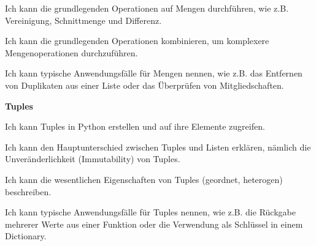 \begin{todolist}
\begin{todolist}
        \item Ich kann die grundlegenden Operationen auf Mengen durchführen, wie z.B. Vereinigung, Schnittmenge und Differenz.
        \item Ich kann die grundlegenden Operationen kombinieren, um komplexere Mengenoperationen durchzuführen.
        \item Ich kann typische Anwendungsfälle für Mengen nennen, wie z.B. das Entfernen von Duplikaten aus einer Liste oder das Überprüfen von Mitgliedschaften.
    \end{todolist}
    \item \textbf{Tuples}
    \begin{todolist}
        \item Ich kann Tuples in Python erstellen und auf ihre Elemente zugreifen.
        \item Ich kann den Hauptunterschied zwischen Tuples und Listen erklären, nämlich die Unveränderlichkeit (Immutability) von Tuples.
        \item Ich kann die wesentlichen Eigenschaften von Tuples (geordnet, heterogen) beschreiben.
        \item Ich kann typische Anwendungsfälle für Tuples nennen, wie z.B. die Rückgabe mehrerer Werte aus einer Funktion oder die Verwendung als Schlüssel in einem Dictionary.
    \end{todolist}
\end{todolist}

